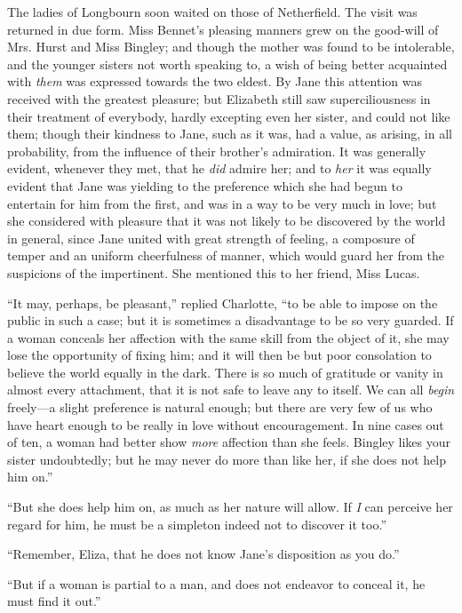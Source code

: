 The ladies of Longbourn soon waited on those of Netherfield. The visit was returned in due form. Miss Bennet's pleasing manners grew on the good-will of Mrs. Hurst and Miss Bingley; and though the mother was found to be intolerable, and the younger sisters not worth speaking to, a wish of being better acquainted with \textit{them} was expressed towards the two eldest. By Jane this attention was received with the greatest pleasure; but Elizabeth still saw superciliousness in their treatment of everybody, hardly excepting even her sister, and could not like them; though their kindness to Jane, such as it was, had a value, as arising, in all probability, from the influence of their brother's admiration. It was generally evident, whenever they met, that he \textit{did} admire her; and to \textit{her} it was equally evident that Jane was yielding to the preference which she had begun to entertain for him from the first, and was in a way to be very much in love; but she considered with pleasure that it was not likely to be discovered by the world in general, since Jane united with great strength of feeling, a composure of temper and an uniform cheerfulness of manner, which would guard her from the suspicions of the impertinent. She mentioned this to her friend, Miss Lucas.

``It may, perhaps, be pleasant,'' replied Charlotte, ``to be able to impose on the public in such a case; but it is sometimes a disadvantage to be so very guarded. If a woman conceals her affection with the same skill from the object of it, she may lose the opportunity of fixing him; and it will then be but poor consolation to believe the world equally in the dark. There is so much of gratitude or vanity in almost every attachment, that it is not safe to leave any to itself. We can all \textit{begin} freely---a slight preference is natural enough; but there are very few of us who have heart enough to be really in love without encouragement. In nine cases out of ten, a woman had better show \textit{more} affection than she feels. Bingley likes your sister undoubtedly; but he may never do more than like her, if she does not help him on.''

``But she does help him on, as much as her nature will allow. If \textit{I} can perceive her regard for him, he must be a simpleton indeed not to discover it too.''

``Remember, Eliza, that he does not know Jane's disposition as you do.''

``But if a woman is partial to a man, and does not endeavor to conceal it, he must find it out.''

